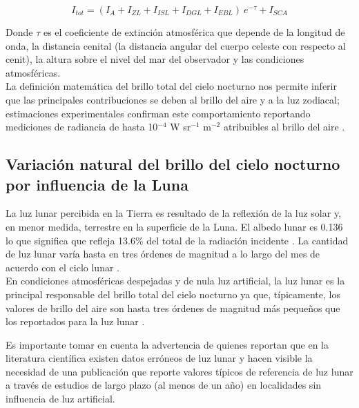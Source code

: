 \begin{equation}
I_{tot} = (I_A + I_{ZL} + I_{ISL} + I_{DGL} + I_{EBL})\:e^{-\tau} + I_{SCA}
\end{equation}

\vspace{2mm} 

Donde $\tau$ es el coeficiente de extinción atmosférica que depende de la longitud de onda, la distancia cenital (la distancia angular del cuerpo celeste con respecto al cenit), la altura sobre el nivel del mar del observador y las condiciones atmosféricas.\\ 

La definición matemática del brillo total del cielo nocturno nos permite inferir que las principales contribuciones se deben al brillo del aire y a la luz zodiacal; estimaciones experimentales confirman este comportamiento reportando mediciones de radiancia de hasta 10$^{-4}$ W sr$^{-1}$  m$^{-2}$ atribuibles al brillo del aire \citep{Leinert1998}.\\ 

\subsection{Variación natural del brillo del cielo nocturno por influencia de la Luna}

La luz lunar percibida en la Tierra es resultado de la reflexión de la luz solar y, en menor medida, terrestre en la superficie de la Luna. El albedo lunar es 0.136 lo que significa que refleja 13.6\% del total de la radiación incidente \citep{Matthews2008}. La cantidad de luz lunar varía hasta en tres órdenes de magnitud a lo largo del mes de acuerdo con el ciclo lunar \citep{Kyba2017}.\\

En condiciones atmosféricas despejadas y de nula luz artificial, la luz lunar es la principal responsable del brillo total del cielo nocturno ya que, típicamente, los valores de brillo del aire son hasta tres órdenes de magnitud más pequeños que los reportados para la luz lunar \citep{Hanel2018}.\\

\newpage

Es importante tomar en cuenta la advertencia de \cite{Kyba2017} quienes reportan que en la literatura científica existen datos erróneos de luz lunar y hacen visible la necesidad de una publicación que reporte valores típicos de referencia de luz lunar a través de estudios de largo plazo (al menos de un año) en localidades sin influencia de luz artificial.\\ 


